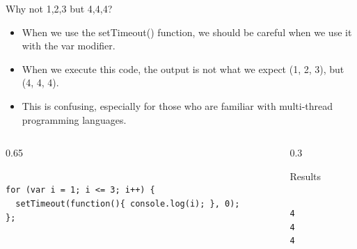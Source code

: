 \begin{frame}[fragile]{Why not 1,2,3 but 4,4,4?}

\begin{itemize}
	\item When we use the setTimeout() function, we should be careful when we use it with the var modifier.
    \item When we execute this code, the output is not what we expect (1, 2, 3), but (4, 4, 4). 
    \item This is confusing, especially for those who are familiar with multi-thread programming languages. 
\end{itemize}

\begin{columns}%
\begin{column}{0.65\textwidth}%
\begin{Code}{}%
\begin{lstlisting}[firstnumber=1, label=glabels, xleftmargin=0pt, basicstyle=\tiny]% 

for (var i = 1; i <= 3; i++) {
  setTimeout(function(){ console.log(i); }, 0);
};
\end{lstlisting}%
\end{Code}%
\end{column}%
\begin{column}{0.3\textwidth}%
\begin{center}%
\begin{Command}{Results}%
\begin{lstlisting}[firstnumber=1, label=glabels, xleftmargin=0pt, basicstyle=\tiny]% 

4
4
4
\end{lstlisting}%
\end{Command}%
\end{center}%
\end{column}%
\end{columns}%
\end{frame}

